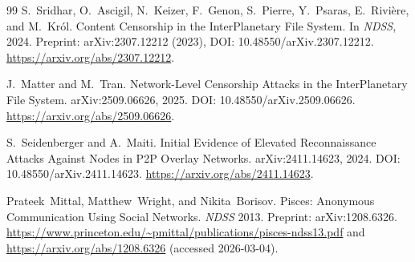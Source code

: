 \documentclass[11pt]{article}
\begin{document}
\begin{thebibliography}{99}
S.~Sridhar, O.~Ascigil, N.~Keizer, F.~Genon, S.~Pierre, Y.~Psaras, E.~Rivi\`ere, and M.~Kr\'ol.
\newblock Content Censorship in the InterPlanetary File System.
\newblock In \emph{NDSS}, 2024.
\newblock Preprint: arXiv:2307.12212 (2023), DOI: 10.48550/arXiv.2307.12212.
\newblock \url{https://arxiv.org/abs/2307.12212}.

J.~Matter and M.~Tran.
\newblock Network-Level Censorship Attacks in the InterPlanetary File System.
\newblock arXiv:2509.06626, 2025. DOI: 10.48550/arXiv.2509.06626.
\newblock \url{https://arxiv.org/abs/2509.06626}.

S.~Seidenberger and A.~Maiti.
\newblock Initial Evidence of Elevated Reconnaissance Attacks Against Nodes in P2P Overlay Networks.
\newblock arXiv:2411.14623, 2024. DOI: 10.48550/arXiv.2411.14623.
\newblock \url{https://arxiv.org/abs/2411.14623}.


Prateek~Mittal, Matthew~Wright, and Nikita~Borisov.
\newblock Pisces: Anonymous Communication Using Social Networks.
\newblock \emph{NDSS} 2013. Preprint: arXiv:1208.6326.
\newblock \url{https://www.princeton.edu/~pmittal/publications/pisces-ndss13.pdf} and \url{https://arxiv.org/abs/1208.6326} (accessed 2026-03-04).

\end{thebibliography}
\end{document}
